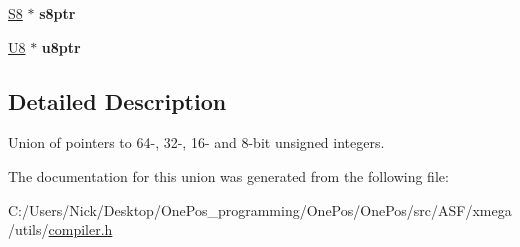 \begin{DoxyCompactItemize}
\item 
\hypertarget{union_union_ptr_a757c9f34a8971c29d4883d86d1ce0bbe}{\hyperlink{group__group__xmega__utils_gaf1475a0bb1962ef08dd1f78bd5dba87a}{S8} $\ast$ {\bfseries s8ptr}}\label{union_union_ptr_a757c9f34a8971c29d4883d86d1ce0bbe}

\item 
\hypertarget{union_union_ptr_a1f8c61121a2da0bb4e862a5ee54dcc44}{\hyperlink{group__group__xmega__utils_gaa63ef7b996d5487ce35a5a66601f3e73}{U8} $\ast$ {\bfseries u8ptr}}\label{union_union_ptr_a1f8c61121a2da0bb4e862a5ee54dcc44}

\end{DoxyCompactItemize}


\subsection{Detailed Description}
Union of pointers to 64-\/, 32-\/, 16-\/ and 8-\/bit unsigned integers. 

The documentation for this union was generated from the following file\-:\begin{DoxyCompactItemize}
\item 
C\-:/\-Users/\-Nick/\-Desktop/\-One\-Pos\-\_\-programming/\-One\-Pos/\-One\-Pos/src/\-A\-S\-F/xmega/utils/\hyperlink{compiler_8h}{compiler.\-h}\end{DoxyCompactItemize}
